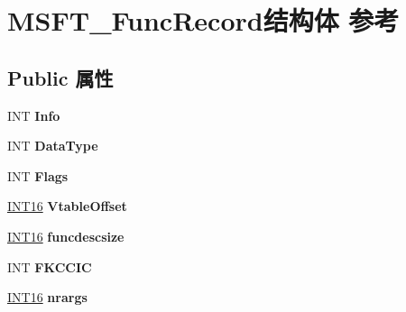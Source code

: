 \hypertarget{struct_m_s_f_t___func_record}{}\section{M\+S\+F\+T\+\_\+\+Func\+Record结构体 参考}
\label{struct_m_s_f_t___func_record}
\subsection*{Public 属性}
\begin{DoxyCompactItemize}
\item 
\mbox{\label{struct_m_s_f_t___func_record_a1e6bb9a9b14ab801dbc537c896c6f00d}} 
I\+NT {\bfseries Info}
\item 
\mbox{\label{struct_m_s_f_t___func_record_a4c5cba4b21731aafd306c2a82a930afa}} 
I\+NT {\bfseries Data\+Type}
\item 
\mbox{\label{struct_m_s_f_t___func_record_a56e8ddf329f47a9f6540b615808bfcc7}} 
I\+NT {\bfseries Flags}
\item 
\mbox{\label{struct_m_s_f_t___func_record_a3151a8cd46abe72b08b93ed5a58c1c0a}} 
\hyperlink{_processor_bind_8h_a30f500129d8c688af07726d5d34ce52d}{I\+N\+T16} {\bfseries Vtable\+Offset}
\item 
\mbox{\label{struct_m_s_f_t___func_record_a9f64994740f754c62f4faa8bc255c05a}} 
\hyperlink{_processor_bind_8h_a30f500129d8c688af07726d5d34ce52d}{I\+N\+T16} {\bfseries funcdescsize}
\item 
\mbox{\label{struct_m_s_f_t___func_record_a40a498fccf9bd0c31ff49cfd051856a2}} 
I\+NT {\bfseries F\+K\+C\+C\+IC}
\item 
\mbox{\label{struct_m_s_f_t___func_record_a5b979c1cc22b6c61386f882a40ebb8ad}} 
\hyperlink{_processor_bind_8h_a30f500129d8c688af07726d5d34ce52d}{I\+N\+T16} {\bfseries nrargs}
\item 
\mbox{\label{struct_m_s_f_t___func_record_afa78516ef219a4179b0e5b936e1a8840}} 

\end{DoxyCompactItemize}
